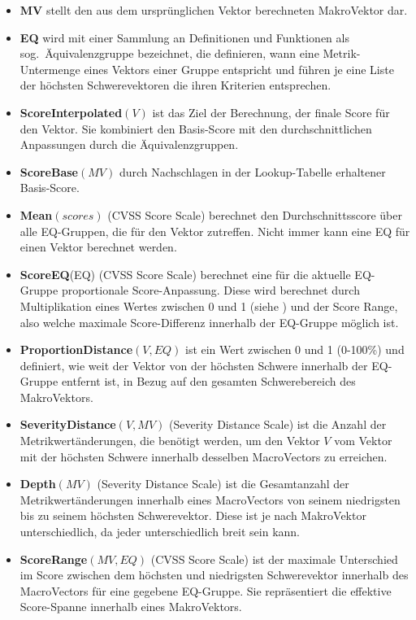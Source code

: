 \begin{itemize}[noitemsep]
    \item \textbf{MV} stellt den aus dem ursprünglichen Vektor berechneten MakroVektor dar.
    \item \textbf{EQ} wird mit einer Sammlung an Definitionen und Funktionen als sog.\ Äquivalenzgruppe bezeichnet, die definieren, wann eine Metrik-Untermenge eines Vektors einer Gruppe entspricht und führen je eine Liste der höchsten Schwerevektoren die ihren Kriterien entsprechen.
    \item \textbf{ScoreInterpolated$(V)$} ist das Ziel der Berechnung, der finale Score für den Vektor.
    Sie kombiniert den Basis-Score mit den durchschnittlichen Anpassungen durch die Äquivalenzgruppen.
    \item \textbf{ScoreBase$(MV)$} durch Nachschlagen in der Lookup-Tabelle erhaltener Basis-Score.
    \item \textbf{Mean$(scores)$} (CVSS Score Scale) berechnet den Durchschnittsscore über alle EQ-Gruppen, die für den Vektor zutreffen.
    Nicht immer kann eine EQ für einen Vektor berechnet werden.
    \item \textbf{ScoreEQ}(EQ) (CVSS Score Scale) berechnet eine für die aktuelle EQ-Gruppe proportionale Score-Anpassung.
    Diese wird berechnet durch Multiplikation eines Wertes zwischen 0 und 1 (siehe ) und der Score Range, also welche maximale Score-Differenz innerhalb der EQ-Gruppe möglich ist.
    \item \textbf{ProportionDistance$(V, EQ)$} ist ein Wert zwischen 0 und 1 (0-100\%) und definiert, wie weit der Vektor von der höchsten Schwere innerhalb der EQ-Gruppe entfernt ist, in Bezug auf den gesamten Schwerebereich des MakroVektors.
    \item \textbf{SeverityDistance$(V, MV)$} (Severity Distance Scale) ist die Anzahl der Metrikwertänderungen, die benötigt werden, um den Vektor $V$ vom Vektor mit der höchsten Schwere innerhalb desselben MacroVectors zu erreichen.
    \item \textbf{Depth$(MV)$} (Severity Distance Scale) ist die Gesamtanzahl der Metrikwertänderungen innerhalb eines MacroVectors von seinem niedrigsten bis zu seinem höchsten Schwerevektor.
    Diese ist je nach MakroVektor unterschiedlich, da jeder unterschiedlich breit sein kann.
    \item \textbf{ScoreRange$(MV, EQ)$} (CVSS Score Scale) ist der maximale Unterschied im Score zwischen dem höchsten und niedrigsten Schwerevektor innerhalb des MacroVectors für eine gegebene EQ-Gruppe.
    Sie repräsentiert die effektive Score-Spanne innerhalb eines MakroVektors.
\end{itemize}

